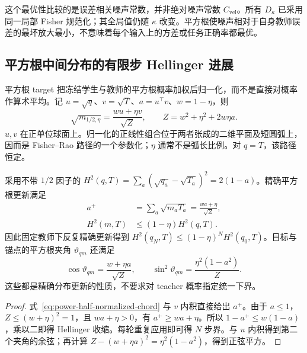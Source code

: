 \documentclass[lang=cn,scheme=chinese,openany]{../book/elegantbook}
\begin{document}
这个最优性比较的是误差相关噪声常数，并非绝对噪声常数 $C_{\mathrm{vel}}$。所有 $D_\kappa$ 已采用同一局部 Fisher 规范化；其全局值仍随 $\kappa$ 改变。平方根使噪声相对于自身教师误差的最坏放大最小，不意味着每个输入上的方差或任务正确率都最优。



\subsection{平方根中间分布的有限步 Hellinger 进展}

平方根 target 把冻结学生与教师的平方根概率加权后归一化，而不是直接对概率作算术平均。记 $u=\sqrt q$、$v=\sqrt T$、$a=u^\top v$、$w=1-\eta$，则
\begin{equation}
 \sqrt{m_{1/2,\eta}}=\frac{wu+\eta v}{\sqrt Z},\qquad
 Z=w^2+\eta^2+2w\eta a.
 \label{eq:power-half-normalized-chord}
\end{equation}
$u,v$ 在正单位球面上。归一化的正线性组合位于两者张成的二维平面及短圆弧上，因而是 Fisher--Rao 路径的一个参数化；$\eta$ 通常不是弧长比例。对 $q=T$，该路径恒定。

\begin{theorem}
\label{thm:power-half-discrete-contraction}
采用不带 $1/2$ 因子的 $H^2(q,T)=\sum_a(\sqrt{q_a}-\sqrt{T_a})^2=2(1-a)$。精确平方根更新满足
\begin{align}
 a^+&=\sum_a\sqrt{m_aT_a}=\frac{wa+\eta}{\sqrt Z},\\
 H^2(m,T)&\le(1-\eta)H^2(q,T).
 \label{eq:power-half-discrete-progress}
\end{align}
因此固定教师下反复精确更新得到 $H^2(q_N,T)\le(1-\eta)^NH^2(q_0,T)$。目标与锚点的平方根夹角 $\vartheta_{qm}$ 还满足
\begin{equation}
 \cos\vartheta_{qm}=\frac{w+\eta a}{\sqrt Z},\qquad
 \sin^2\vartheta_{qm}=\frac{\eta^2(1-a^2)}Z.
\end{equation}
这些都是精确分布更新的性质，不要求对 teacher 概率指定统一下界。
\end{theorem}

\begin{proof}
式~\eqref{eq:power-half-normalized-chord} 与 $v$ 内积直接给出 $a^+$。由于 $a\le1$，$Z\le(w+\eta)^2=1$，且 $wa+\eta>0$，有 $a^+\ge wa+\eta$。所以 $1-a^+\le w(1-a)$，乘以二即得 Hellinger 收缩。每轮重复应用即可得 $N$ 步界。与 $u$ 内积得到第二个夹角的余弦；再计算 $Z-(w+\eta a)^2=\eta^2(1-a^2)$，得到正弦平方。
\end{proof}
\end{document}
